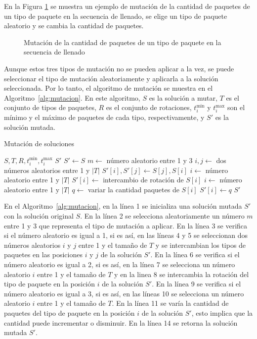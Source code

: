 \documentclass[openany]{article}
\begin{document}
En la Figura \ref{fig:mutacion_cantidad} se muestra un ejemplo de mutación de la cantidad de paquetes de un tipo de paquete en la secuencia de llenado, se elige un tipo de paquete aleatorio y se cambia la cantidad de paquetes.

\begin{figure}[H]
    \centering
    
    \caption{Mutación de la cantidad de paquetes de un tipo de paquete en la secuencia de llenado}
    \label{fig:mutacion_cantidad}
\end{figure}

Aunque estos tres tipos de mutación no se pueden aplicar a la vez, se puede seleccionar el tipo de mutación aleatoriamente y aplicarla a la solución seleccionada. Por lo tanto, el algoritmo de mutación se muestra en el Algoritmo~\ref{alg:mutacion}. En este algoritmo, $S$ es la solución a mutar, $T$ es el conjunto de tipos de paquetes, $R$ es el conjunto de rotaciones, $t_i^{\min}$ y $t_i^{\max}$ son el mínimo y el máximo de paquetes de cada tipo, respectivamente, y $S'$ es la solución mutada.

\begin{algorithm}[H]
    \caption{Mutación de soluciones}\label{alg:mutacion}
    \begin{algorithmic}[1]
        \Require $S, T, R, t_i^{\min}, t_i^{\max}$
        \Ensure $S'$
        \State $S' \leftarrow S$
        \State $m \leftarrow$ número aleatorio entre 1 y 3
        \State $i, j \leftarrow$ dos números aleatorios entre 1 y $|T|$
        \State $S'[i], S'[j] \leftarrow S[j], S[i]$
        \State $i \leftarrow$ número aleatorio entre 1 y $|T|$
        \State $S'[i] \leftarrow$ intercambio de rotación de $S[i]$
        \State $i \leftarrow$ número aleatorio entre 1 y $|T|$
        \State $q \leftarrow$ variar la cantidad paquetes de $S[i]$
        \State $S'[i] \leftarrow q$
        \EndIf
        \State \Return $S'$
    \end{algorithmic}
\end{algorithm}

En el Algoritmo~\ref{alg:mutacion}, en la línea 1 se inicializa una solución mutada $S'$ con la solución original $S$. En la línea 2 se selecciona aleatoriamente un número $m$ entre 1 y 3 que representa el tipo de mutación a aplicar. En la línea 3 se verifica si el número aleatorio es igual a 1, si es así, en las líneas 4 y 5 se seleccionan dos números aleatorios $i$ y $j$ entre 1 y el tamaño de $T$ y se intercambian los tipos de paquetes en las posiciones $i$ y $j$ de la solución $S'$. En la línea 6 se verifica si el número aleatorio es igual a 2, si es así, en la línea 7 se selecciona un número aleatorio $i$ entre 1 y el tamaño de $T$ y en la linea 8 se intercambia la rotación del tipo de paquete en la posición $i$ de la solución $S'$. En la línea 9 se verifica si el número aleatorio es igual a 3, si es así, en las líneas 10 se selecciona un número aleatorio $i$ entre 1 y el tamaño de $T$. En la línea 11 se varía la cantidad de paquetes del tipo de paquete en la posición $i$ de la solución $S'$, esto implica que la cantidad puede incrementar o disminuir. En la línea 14 se retorna la solución mutada $S'$.
\end{document}
